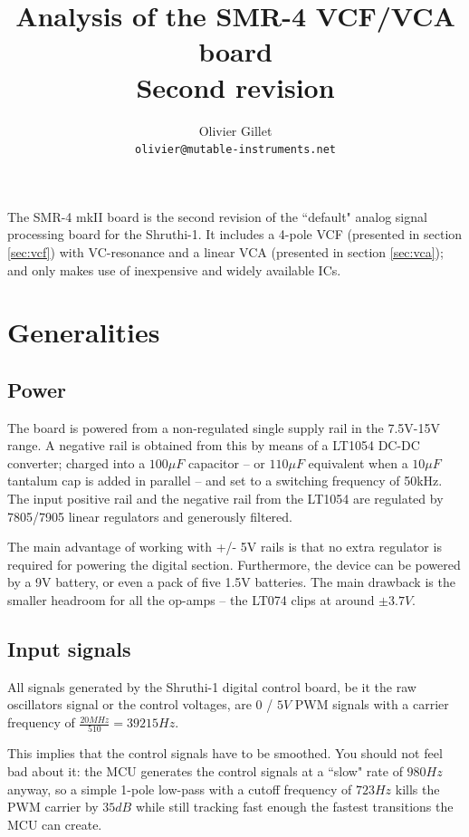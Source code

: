 \documentclass[a4paper,11pt]{article}
\title{Analysis of the SMR-4 VCF/VCA board\\Second revision}
\author{Olivier Gillet \\ \tt olivier@mutable-instruments.net}
\date{}
\begin{document}
\maketitle

The SMR-4 mkII board is the second revision of the ``default" analog signal processing board for the  Shruthi-1. It includes a 4-pole VCF (presented in section \ref{sec:vcf}) with VC-resonance and a linear VCA (presented in section \ref{sec:vca}); and only makes use of inexpensive and widely available ICs.

\section{Generalities}

\subsection{Power}

The board is powered from a non-regulated single supply rail in the 7.5V-15V range. A negative rail is obtained from this by means of a LT1054 DC-DC converter; charged into a $100\mu F$ capacitor -- or $110\mu F$ equivalent when a $10\mu F$ tantalum cap is added in parallel -- and set to a switching frequency of 50kHz. The input positive rail and the negative rail from the LT1054 are regulated by 7805/7905 linear regulators and generously filtered.

The main advantage of working with +/- 5V rails is that no extra regulator is required for powering the digital section. Furthermore, the device can be powered by a 9V battery, or even a pack of five 1.5V batteries. The main drawback is the smaller headroom for all the op-amps -- the LT074 clips at around $\pm 3.7V$.

\subsection{Input signals}

All signals generated by the Shruthi-1 digital control board, be it the raw oscillators signal or the control voltages, are $0$ / $5V$ PWM signals with a carrier frequency of $\frac{20MHz}{510} = 39215 Hz$.

This implies that the control signals have to be smoothed. You should not feel bad about it: the MCU generates the control signals at a ``slow" rate of $980 Hz$ anyway, so a simple 1-pole low-pass with a cutoff frequency of $723 Hz$ kills the PWM carrier by $35dB$ while still tracking fast enough the fastest transitions the MCU can create.
\end{document}
